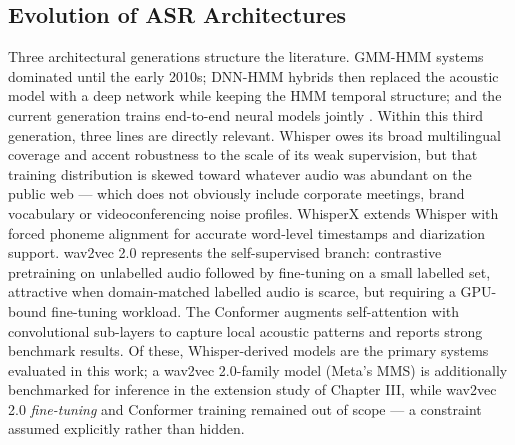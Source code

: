 \documentclass[12pt]{report}
\begin{document}
\subsection{Evolution of ASR Architectures}
Three architectural generations structure the literature. GMM-HMM systems dominated until the early 2010s; DNN-HMM hybrids then replaced the acoustic model with a deep network while keeping the HMM temporal structure; and the current generation trains end-to-end neural models jointly \cite{li2014overview,vaswani2017attention}. Within this third generation, three lines are directly relevant. Whisper \cite{radford2023robust} owes its broad multilingual coverage and accent robustness to the scale of its weak supervision, but that training distribution is skewed toward whatever audio was abundant on the public web --- which does not obviously include corporate meetings, brand vocabulary or videoconferencing noise profiles. WhisperX \cite{bain2023whisperx} extends Whisper with forced phoneme alignment for accurate word-level timestamps and diarization support. wav2vec 2.0 \cite{baevski2020wav2vec} represents the self-supervised branch: contrastive pretraining on unlabelled audio followed by fine-tuning on a small labelled set, attractive when domain-matched labelled audio is scarce, but requiring a GPU-bound fine-tuning workload. The Conformer \cite{gulati2020conformer} augments self-attention with convolutional sub-layers to capture local acoustic patterns and reports strong benchmark results. Of these, Whisper-derived models are the primary systems evaluated in this work; a wav2vec 2.0-family model (Meta's MMS) is additionally benchmarked for inference in the extension study of Chapter III, while wav2vec 2.0 \emph{fine-tuning} and Conformer training remained out of scope --- a constraint assumed explicitly rather than hidden.
\end{document}
